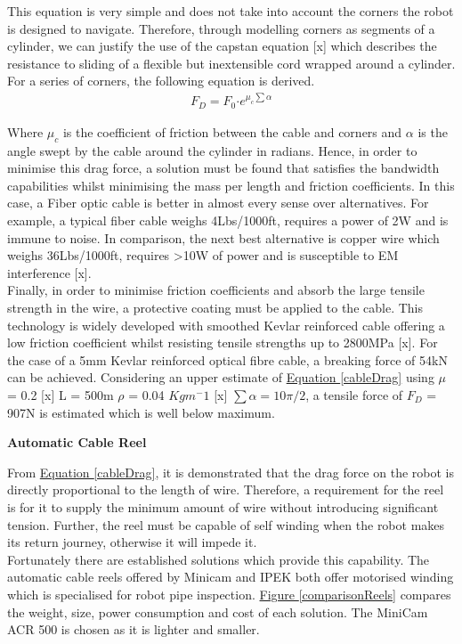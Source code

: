 \documentclass[11pt]{article}		%
\newcommand{\figref}[1]{\hyperref[#1]{Figure \ref*{#1}}}    %
\newcommand{\equationref}[1]{\hyperref[#1]{Equation \ref*{#1}}}     %
\begin{document}
        This equation is very simple and does not take into account the corners the robot is designed to navigate. 
        Therefore, through modelling corners as segments of a cylinder, we can justify the use of the capstan equation [x] which describes the resistance to sliding of a flexible but inextensible cord wrapped around a cylinder. 
        For a series of corners, the following equation is derived.
        \begin{align}
                F_D = F_0 \boldsymbol{\cdot} {e}^{\mu_c \sum \alpha} \label{cableDrag}
        \end{align}

		Where $\mu_c$ is the coefficient of friction between the cable and corners and $\alpha$ is the angle swept by the cable around the cylinder in radians. 
	    Hence, in order to minimise this drag force, a solution must be found that satisfies the bandwidth capabilities whilst minimising the mass per length and friction coefficients.  
	    In this case, a Fiber optic cable is better in almost every sense over alternatives. 
	    For example, a typical fiber cable weighs 4Lbs/1000ft, requires a power of 2W and is immune to noise. 
	    In comparison, the next best alternative is copper wire which weighs 36Lbs/1000ft, requires >10W of power and is susceptible to EM interference [x].
	    \\
	    Finally, in order to minimise friction coefficients and absorb the large tensile strength in the wire, a protective coating must be applied to the cable. 
	    This technology is widely developed with smoothed Kevlar reinforced cable offering a low friction coefficient whilst resisting tensile strengths up to 2800MPa [x]. For the case of a 5mm Kevlar reinforced optical fibre cable, a breaking force of 54kN can be achieved. 
	    Considering an upper estimate of \equationref{cableDrag} using $\mu$ = 0.2 [x] L = 500m $\rho$ = 0.04 $Kgm^-1$ [x] $\sum \alpha = 10\pi/2$, a tensile force of $F_D$ = 907N is estimated which is well below maximum. 
	    
	    \textbf{Automatic Cable Reel}

        From \equationref{cableDrag}, it is demonstrated that the drag force on the robot is directly proportional to the length of wire. 
        Therefore, a requirement for the reel is for it to supply the minimum amount of wire without introducing significant tension. 
        Further, the reel must be capable of self winding when the robot makes its return journey, otherwise it will impede it.
        \\ 
        \hspace*{3ex}Fortunately there are established solutions which provide this capability. 
        The automatic cable reels offered by Minicam and IPEK both offer motorised winding which is specialised for robot pipe inspection. 
        \figref{comparisonReels} compares the weight, size, power consumption and cost of each solution. 
        The MiniCam ACR 500 is chosen as it is lighter and smaller. 
\end{document}
